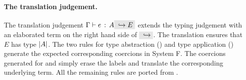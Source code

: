 \begin{comment}
For example, \[ 1 \mergeop \code{"one"} \] becomes \pair 1
{\code{"one"}}. In usage, the pair will be coerced according to type
information. For example, consider the function application: \[ \app {(\lamty x
\tystring x)} {(1 \mergeop \code{"one"})} \] This expression will be translated to \[ \app
{(\lamty x \tystring x)} {(\app {(\lamty x {\pair \tyint \tystring} {\proj 2 x})}
{\pair 1 {\code{"one"}}})} \] The coercion in this case is $(\lamty x {\pair
\tyint \tystring} {\proj 2 x})$. It extracts the second item from the pair, since
the function expects a $\tystring$ but the translated argument is of type $\pair
\tyint \tystring$.
\end{comment}

\paragraph{The translation judgement.} 
The translation judgement $\jtype \Gamma e A \yields E$ extends the
typing judgement with an elaborated term on the right hand side of
$\yields {}$.  The translation ensures that $E$ has type $\lvert A \rvert$.  
The two rules for type abstraction () and type
application () generate the expected
corresponding coercions in System F.  
The coercions generated for  and  
simply erase the labels and translate the corresponding underlying term. 
All the remaining rules are ported from \oldname. 




